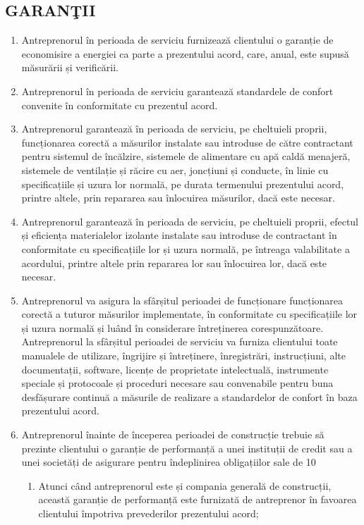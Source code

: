 \begin{multicols}{2}
\subsection{GARANŢII}
\begin{enumerate}
\item Antreprenorul în perioada de serviciu furnizează clientului o garanție de economisire a energiei ca parte a prezentului acord, care, anual, este supusă măsurării și verificării.
\item Antreprenorul în perioada de serviciu garantează standardele de confort convenite în conformitate cu prezentul acord.
\item Antreprenorul garantează în perioada de serviciu, pe cheltuieli proprii, funcționarea corectă a măsurilor instalate sau introduse de către contractant pentru sistemul de încălzire, sistemele de alimentare cu apă caldă menajeră, sistemele de ventilație și răcire cu aer, joncțiuni și conducte, în linie cu specificațiile și uzura lor normală, pe durata termenului prezentului acord, printre altele, prin repararea sau înlocuirea măsurilor, dacă este necesar.
\item Antreprenorul garantează în perioada de serviciu, pe cheltuieli proprii, efectul și eficiența materialelor izolante instalate sau introduse de contractant în conformitate cu specificațiile lor și uzura normală, pe întreaga valabilitate a acordului, printre altele prin repararea lor sau înlocuirea lor, dacă este necesar.
\item Antreprenorul va asigura la sfârșitul perioadei de funcționare funcționarea corectă a tuturor măsurilor implementate, în conformitate cu specificațiile lor și uzura normală și luând în considerare întreținerea corespunzătoare. Antreprenorul la sfârșitul perioadei de serviciu va furniza clientului toate manualele de utilizare, îngrijire și întreținere, înregistrări, instrucțiuni, alte documentații, software, licențe de proprietate intelectuală, instrumente speciale și protocoale și proceduri necesare sau convenabile pentru buna desfășurare continuă a măsurile de realizare a standardelor de confort în baza prezentului acord.
\item Antreprenorul înainte de începerea perioadei de construcție trebuie să prezinte clientului o garanție de performanță a unei instituții de credit sau a unei societăți de asigurare pentru îndeplinirea obligațiilor sale de 10%
 \begin{enumerate}
\item Atunci când antreprenorul este și compania generală de construcții, această garanție de performanță este furnizată de antreprenor în favoarea clientului împotriva prevederilor prezentului acord;

\end{enumerate}
\end{enumerate}
\end{multicols}
